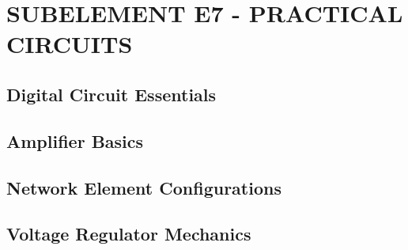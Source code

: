 \documentclass[12pt]{book}
\begin{document}
\chapter{SUBELEMENT E7 - PRACTICAL CIRCUITS}
\section{Digital Circuit Essentials}











\section{Amplifier Basics}












\section{Network Element Configurations}











\section{Voltage Regulator Mechanics}















\end{document}
